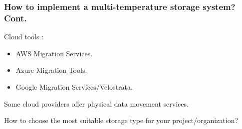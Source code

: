 
\begin{frame}
\frametitle{How to implement a multi-temperature storage system? Cont.}
\begin{wideitemize}
\item Cloud tools \forexample:
\begin{itemize}
\item AWS Migration Services.
\item Azure Migration Tools.
\item Google Migration Services/Velostrata.
\end{itemize}
\item Some cloud providers offer physical data movement services.
\item How to choose the most suitable storage type for your project/organization?
\end{wideitemize}
\end{frame}
